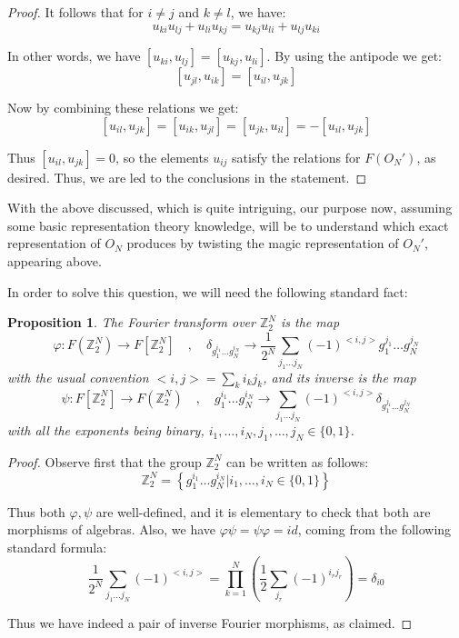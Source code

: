 \documentclass[12pt]{amsbook}
\newtheorem{proposition}[theorem]{Proposition}
\begin{document}
\begin{proof}
It follows that for $i\neq j$ and $k\neq l$, we have:
$$u_{ki}u_{lj}+u_{li}u_{kj}=u_{kj}u_{li}+u_{lj}u_{ki}$$

In other words, we have $[u_{ki},u_{lj}]=[u_{kj},u_{li}]$. By using the antipode we get:
$$[u_{jl},u_{ik}]=[u_{il},u_{jk}]$$

Now by combining these relations we get:
$$[u_{il},u_{jk}]=[u_{ik},u_{jl}]=[u_{jk},u_{il}]=-[u_{il},u_{jk}]$$

Thus $[u_{il},u_{jk}]=0$, so the elements $u_{ij}$ satisfy the relations for $F(O_N')$, as desired. Thus, we are led to the conclusions in the statement.
\end{proof}

With the above discussed, which is quite intriguing, our purpose now, assuming some basic representation theory knowledge, will be to understand which exact representation of $O_N$ produces by twisting the magic representation of $O_N'$, appearing above. 

\bigskip

In order to solve this question, we will need the following standard fact:

\begin{proposition}
The Fourier transform over $\mathbb Z_2^N$ is the map
$$\varphi:F(\mathbb Z_2^N)\to F[\mathbb Z_2^N]\quad,\quad 
\delta_{g_1^{i_1}\ldots g_N^{i_N}}\to\frac{1}{2^N}\sum_{j_1\ldots j_N}(-1)^{<i,j>}g_1^{j_1}\ldots g_N^{j_N}$$
with the usual convention $<i,j>=\sum_ki_kj_k$, and its inverse is the map
$$\psi:F[\mathbb Z_2^N]\to F(\mathbb Z_2^N)\quad,\quad 
g_1^{i_1}\ldots g_N^{i_N}\to\sum_{j_1\ldots j_N}(-1)^{<i,j>}\delta_{g_1^{j_1}\ldots g_N^{j_N}}$$
with all the exponents being binary, $i_1,\ldots,i_N,j_1,\ldots,j_N\in\{0,1\}$.
\end{proposition}

\begin{proof}
Observe first that the group $\mathbb Z_2^N$ can be written as follows:
$$\mathbb Z_2^N=\left\{g_1^{i_1}\ldots g_N^{i_N}\Big|i_1,\ldots,i_N\in\{0,1\}\right\}$$

Thus both $\varphi,\psi$ are well-defined, and it is elementary to check that both are morphisms of algebras. Also, we have $\varphi\psi=\psi\varphi=id$, coming from the following standard formula:
$$\frac{1}{2^N}\sum_{j_1\ldots j_N}(-1)^{<i,j>}
=\prod_{k=1}^N\left(\frac{1}{2}\sum_{j_r}(-1)^{i_rj_r}\right)
=\delta_{i0}$$

Thus we have indeed a pair of inverse Fourier morphisms, as claimed.
\end{proof}
\end{document}
